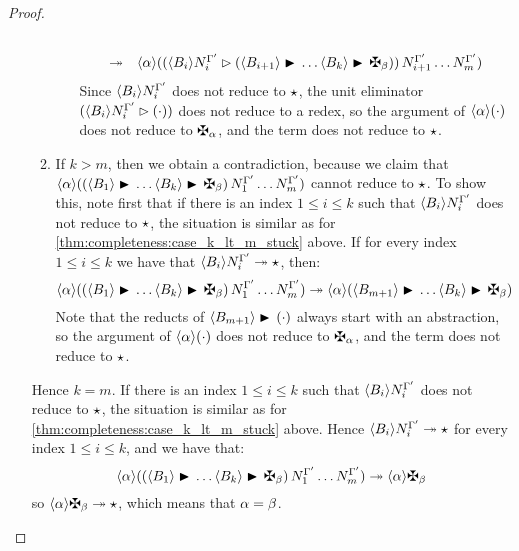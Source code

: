 \begin{proof}
\begin{enumerate}
\begin{enumerate}
\begin{enumerate}
\[\begin{array}{ll}
        \\
        \tos &
        \verifbtyp{((\eunit{\verif{\typtwo_i}{\subs{\utmtwo_i}{\tenvtwo}}}{(\lamt{\typtwo_{i+1}}{\hdots\lamt{\typtwo_k}{\gen{\btyptwo}}})})\,\subs{\utmtwo_{i+1}}{\tenvtwo}\hdots\subs{\utmtwo_m}{\tenvtwo})}
        \end{array}
      \]
      Since $\langle B_i\rangle N_i^{\Gamma'}$ does not reduce to $\star$,
      the unit eliminator
      $(\langle B_i\rangle N_i^{\Gamma'}\rhd(\cdot))$
      does not reduce to a redex,
      so the argument of $\langle\alpha\rangle(\cdot)$ does not reduce to $\genbtyp$,
      and the term does not reduce to $\star$.
    \end{enumerate}
  \item
    If $k > m$, then we obtain a contradiction, because we claim that
    $\verifbtyp{((\lamt{\typtwo_1}{\hdots\lamt{\typtwo_k}{\gen{\btyptwo}}})\,\subs{\utmtwo_1}{\tenvtwo}\hdots\subs{\utmtwo_m}{\tenvtwo})}$
    cannot reduce to $\star$.
    To show this, note first that
    if there is an index $1 \leq i \leq k$ such that
    $\langle B_i\rangle N_i^{\Gamma'}$ does not reduce to $\star$,
    the situation is similar as for \cref{thm:completeness:case_k_lt_m_stuck} above.
    If for every index $1 \leq i \leq k$ we have that
    $\langle B_i\rangle N_i^{\Gamma'} \twoheadrightarrow \star$,
    then:
    \[
      \verifbtyp{((\lamt{\typtwo_1}{\hdots\lamt{\typtwo_k}{\gen{\btyptwo}}})\,\subs{\utmtwo_1}{\tenvtwo}\hdots\subs{\utmtwo_m}{\tenvtwo})}
      \tos
      \verifbtyp{(\lamt{\typtwo_{m+1}}{\hdots\lamt{\typtwo_k}{\gen{\btyptwo}}})}
    \]
    Note that the reducts of $\langle B_{m+1}\rangle\blacktriangleright\,(\cdot)$ always start with an abstraction,
    so the argument of $\langle\alpha\rangle(\cdot)$ does not reduce to $\genbtyp$,
    and the term does not reduce to $\star$.
  \end{enumerate}
  Hence $k = m$.
  If there is an index $1 \leq i \leq k$ such that
  $\langle B_i\rangle N_i^{\Gamma'}$ does not reduce to $\star$,
  the situation is similar as for \cref{thm:completeness:case_k_lt_m_stuck} above.
  Hence $\langle B_i\rangle N_i^{\Gamma'} \twoheadrightarrow \star$
  for every index $1 \leq i \leq k$, and we have that:
  \[
    \verifbtyp{((\lamt{\typtwo_1}{\hdots\lamt{\typtwo_k}{\gen{\btyptwo}}})\,\subs{\utmtwo_1}{\tenvtwo}\hdots\subs{\utmtwo_m}{\tenvtwo})}
    \tos
    \verifbtyp{\gen{\btyptwo}}
  \]
  so $\verifbtyp{\gen{\btyptwo}} \tos \iunit$,
  which means that $\alpha = \beta$.


\end{enumerate}
\end{proof}
